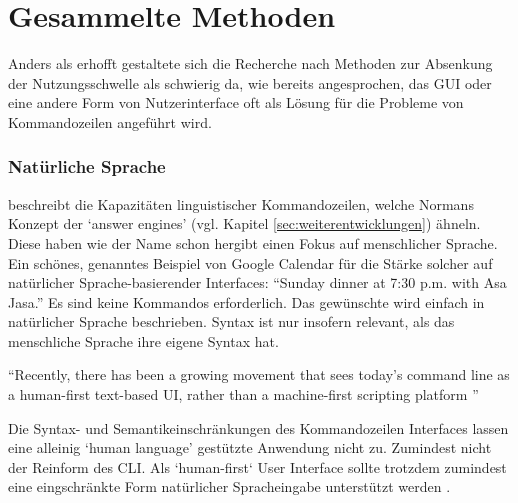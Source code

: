\documentclass[oneside,bibliography=totocnumbered,BCOR=5mm]{scrbook}
\begin{document}
\section{Gesammelte Methoden}

\newcommand{\methbox}[2]{
  \fbox{\parbox{\linewidth}{
    \refstepcounter{meth}
    \textbf{Methode~\themeth}: #2
    \label{meth:#1}
  }}
}
\newcommand{\methref}[1]{
  Methode~\ref{meth:#1}
}

Anders als erhofft gestaltete sich die Recherche nach Methoden zur Absenkung
der Nutzungsschwelle als schwierig da, wie bereits angesprochen, das GUI oder
eine andere Form von Nutzerinterface oft als Lösung für die Probleme von
Kommandozeilen angeführt wird.



\subsubsection{Natürliche Sprache}
\label{sec:natural-lang}

\cite{Raskin_2008} beschreibt die Kapazitäten linguistischer
Kommandozeilen, welche Normans Konzept der `answer engines' (vgl. Kapitel
\ref{sec:weiterentwicklungen}) ähneln. Diese haben wie der Name schon hergibt
einen Fokus auf menschlicher Sprache.
Ein schönes, genanntes Beispiel von Google Calendar für die Stärke solcher auf
natürlicher Sprache-basierender Interfaces: ``Sunday dinner at 7:30 p.m. with
Asa Jasa.'' Es sind keine Kommandos erforderlich. Das gewünschte wird einfach
in natürlicher Sprache beschrieben. Syntax ist nur insofern relevant, als das
menschliche Sprache ihre eigene Syntax hat.

\medskip

``Recently, there has been a growing movement that sees today's command line
as a human-first text-based UI, rather than a machine-first scripting platform
\parencite{clig}'' \parencite{Schr_der_2021}

\medskip

Die Syntax- und Semantikeinschränkungen des Kommandozeilen Interfaces lassen
eine alleinig `human language' gestützte Anwendung nicht zu. Zumindest nicht
der Reinform des CLI. Als `human-first` User Interface sollte trotzdem
zumindest eine eingschränkte Form natürlicher Spracheingabe unterstützt werden
\parencite{seneviratne2008new}.
\end{document}
